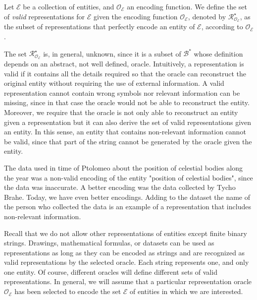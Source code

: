 \begin{definition}
Let $\mathcal{E}$ be a collection of entities, and $\mathcal{O}_\mathcal{E}$ an encoding function. We define the set of \emph{valid} representations for $\mathcal{E}$ given the encoding function $\mathcal{O}_\mathcal{E}$, denoted by $\mathcal{R}^\star_{\mathcal{O}_\mathcal{E}}$, as the subset of representations that perfectly encode an entity of $\mathcal{E}$, according to $\mathcal{O}_\mathcal{E}$.
\end{definition}

The set $\mathcal{R}^\star_{\mathcal{O}_\mathcal{E}}$ is, in general, unknown, since it is a subset of $\mathcal{B}^\ast$ whose definition depends on an abstract, not well defined, oracle. Intuitively, a representation is valid if it contains all the details required so that the oracle can reconstruct the original entity without requiring the use of external information. A valid representation cannot contain wrong symbols nor relevant information can be missing, since in that case the oracle would not be able to reconstruct the entity. Moreover, we require that the oracle is not only able to reconstruct an entity given a representation but it can also derive the set of valid representations given an entity. In this sense, an entity that contains non-relevant information cannot be valid, since that part of the string cannot be generated by the oracle given the entity.

\begin{example}
The data used in time of Ptolomeo about the position of celestial bodies along the year was a non-valid encoding of the entity "position of celestial bodies", since the data was inaccurate. A better encoding was the data collected by Tycho Brahe. Today, we have even better encodings. Adding to the dataset the name of the person who collected the data is an example of a representation that includes non-relevant information.
\end{example}

Recall that we do not allow other representations of entities except finite binary strings. Drawings, mathematical formulas, or datasets can be used as representations as long as they can be encoded as strings and are recognized as valid representations by the selected oracle. Each string represents one, and only one entity. Of course, different oracles will define different sets of valid representations. In general, we will assume that a particular representation oracle $\mathcal{O}_\mathcal{E}$ has been selected to encode the set $\mathcal{E}$ of entities in which we are interested.

